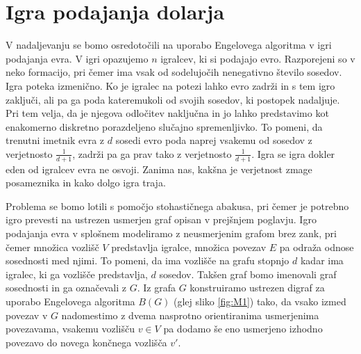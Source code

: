 \documentclass[twoside,11pt]{article}
\begin{document}
\section{Igra podajanja dolarja}
V nadaljevanju se bomo osredotočili na uporabo Engelovega algoritma v igri podajanja evra. V igri opazujemo $n$ 
igralcev, ki si podajajo evro. Razporejeni so v neko formacijo, pri čemer ima vsak od sodelujočih nenegativno število sosedov. Igra poteka izmenično. 
Ko je igralec na potezi lahko evro zadrži in s tem igro zaključi, ali pa ga poda kateremukoli od svojih sosedov, ki postopek nadaljuje. Pri tem velja, da je njegova odločitev naključna in jo lahko predstavimo kot enakomerno diskretno porazdeljeno slučajno spremenljivko. To pomeni, da trenutni imetnik evra z $d$ sosedi evro poda naprej vsakemu od sosedov
z verjetnosto $\frac{1}{d+1}$, zadrži pa ga prav tako z verjetnosto $\frac{1}{d+1}$. Igra se igra dokler eden od igralcev evra ne osvoji. Zanima nas, kakšna je verjetnost zmage posameznika in kako dolgo igra traja.

Problema se bomo lotili s pomočjo stohastičnega abakusa, pri čemer je potrebno igro prevesti na ustrezen usmerjen graf opisan v prejšnjem poglavju. Igro podajanja evra v splošnem modeliramo z neusmerjenim grafom brez zank, pri čemer množica vozlišč $V$ predstavlja igralce, množica povezav $E$ pa odraža odnose sosednosti med njimi.
To pomeni, da ima vozlišče na grafu stopnjo $d$ kadar ima igralec, ki ga vozlišče predstavlja, $d$ sosedov. Takšen graf bomo imenovali graf sosednosti in ga označevali z $G$. 
Iz grafa $G$ konstruiramo ustrezen digraf za uporabo Engelovega algoritma $B(G)$ (glej sliko \ref{fig:M1}) tako, da vsako izmed povezav v $G$ nadomestimo z dvema nasprotno orientiranima usmerjenima povezavama, vsakemu vozlišču $v\in V$ pa dodamo še eno usmerjeno izhodno povezavo do novega končnega vozlišča $v'$. 
 
\end{document}

